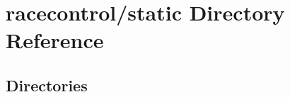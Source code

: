 \section{racecontrol/static Directory Reference}
\label{dir_445b94fd1bbb81d51c60d80b2f124b95}
\subsection*{Directories}
\begin{DoxyCompactItemize}
\end{DoxyCompactItemize}

